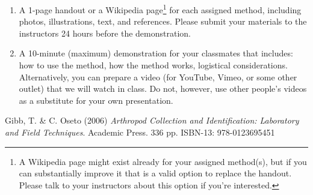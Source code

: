 \documentclass[letterpaper, 11pt]{article}
\begin{document}
\begin{enumerate}
\item A 1-page handout or a Wikipedia page\footnote{A Wikipedia page might exist already for your assigned method(s), but if you can substantially improve it that is a valid option to replace the handout. Please talk to your instructors about this option if you’re interested.} for each assigned method, including photos, illustrations, text, and references. Please submit your materials to the instructors 24 hours before the demonstration.
\item A 10-minute (maximum) demonstration for your classmates that includes: how to use the method, how the method works, logistical considerations. Alternatively, you can prepare a video (for YouTube, Vimeo, or some other outlet) that we will watch in class. Do not, however, use other people's videos as a substitute for your own presentation.
\end{enumerate}

\begin{thebibliography}{9}
 Gibb, T. \& C. Oseto (2006) \textit{Arthropod Collection and Identification: Laboratory and Field Techniques}. Academic Press. 336 pp. ISBN-13: 978-0123695451

\end{thebibliography}
\end{document}
